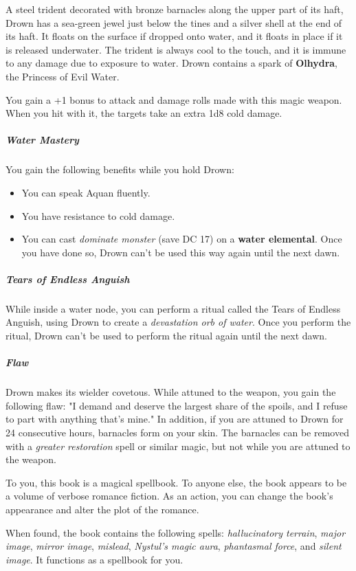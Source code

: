\documentclass[10pt,a4paper,twoside,bg=print,twocolumn,openany,nodeprecatedcode]{dndbook}
\begin{document}
A steel trident decorated with bronze barnacles along the upper part of its haft, Drown has a sea-green jewel just below the tines and a silver shell at the end of its haft. It floats on the surface if dropped onto water, and it floats in place if it is released underwater. The trident is always cool to the touch, and it is immune to any damage due to exposure to water. Drown contains a spark of \textbf{Olhydra}, the Princess of Evil Water.

You gain a +1 bonus to attack and damage rolls made with this magic weapon. When you hit with it, the targets take an extra 1d8 cold damage.

\subparagraph{Water Mastery}
You gain the following benefits while you hold Drown:


\begin{itemize}
\item You can speak Aquan fluently.
\item You have resistance to cold damage.
\item You can cast \textit{dominate monster} (save DC 17) on a \textbf{water elemental}. Once you have done so, Drown can't be used this way again until the next dawn.
\end{itemize}

\subparagraph{Tears of Endless Anguish}
While inside a water node, you can perform a ritual called the Tears of Endless Anguish, using Drown to create a \textit{devastation orb of water}. Once you perform the ritual, Drown can't be used to perform the ritual again until the next dawn.

\subparagraph{Flaw}
Drown makes its wielder covetous. While attuned to the weapon, you gain the following flaw: "I demand and deserve the largest share of the spoils, and I refuse to part with anything that's mine." In addition, if you are attuned to Drown for 24 consecutive hours, barnacles form on your skin. The barnacles can be removed with a \textit{greater restoration} spell or similar magic, but not while you are attuned to the weapon.

To you, this book is a magical spellbook. To anyone else, the book appears to be a volume of verbose romance fiction. As an action, you can change the book's appearance and alter the plot of the romance.

When found, the book contains the following spells: \textit{hallucinatory terrain}, \textit{major image}, \textit{mirror image}, \textit{mislead}, \textit{Nystul's magic aura}, \textit{phantasmal force}, and \textit{silent image}. It functions as a spellbook for you.
\end{document}
